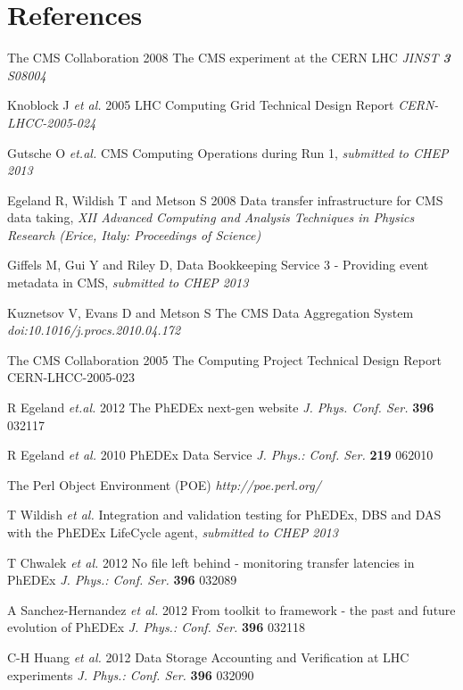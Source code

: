 \section*{References}

\begin{thebibliography}{1}
The CMS Collaboration 2008 The CMS experiment at the CERN LHC {\it JINST {\bf 3} S08004}

Knoblock J {\it et al.} 2005 LHC Computing Grid Technical Design Report {\it CERN-LHCC-2005-024}

 Gutsche O {\it et.al.} CMS Computing Operations during Run 1, {\it submitted to CHEP 2013}

  Egeland R, Wildish T and Metson S 2008 Data transfer infrastructure for CMS data taking,  {\it XII Advanced Computing and Analysis Techniques in Physics Research (Erice, Italy: Proceedings of Science)}

Giffels M, Gui Y and Riley D, Data Bookkeeping Service 3 - Providing event metadata in CMS, {\it submitted to CHEP 2013}

Kuznetsov V, Evans D and Metson S The CMS Data Aggregation System
{\it doi:10.1016/j.procs.2010.04.172}

The CMS Collaboration 2005 The Computing Project Technical Design Report CERN-LHCC-2005-023

R Egeland {\it et.al.} 2012  The PhEDEx next-gen website {\it J. Phys. Conf. Ser.} {\bf 396} 032117

R Egeland {\it et al.} 2010  PhEDEx Data Service {\it J. Phys.: Conf. Ser.} {\bf 219} 062010

The Perl Object Environment (POE)  {\it http://poe.perl.org/}

T Wildish {\it et al.} Integration and validation testing for PhEDEx, DBS and DAS with the PhEDEx LifeCycle agent,
{\it submitted to CHEP 2013}

T Chwalek {\it et al.} 2012  No file left behind - monitoring transfer latencies in PhEDEx {\it J. Phys.: Conf. Ser.} {\bf 396} 032089

A Sanchez-Hernandez {\it et al.} 2012 From toolkit to framework - the past and future evolution of PhEDEx {\it J. Phys.: Conf. Ser.} {\bf 396} 032118

C-H Huang {\it et al.}  2012 Data Storage Accounting and Verification at LHC experiments  {\it J. Phys.: Conf. Ser.} {\bf 396} 032090 


\end{thebibliography}
